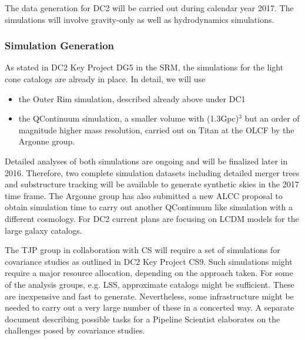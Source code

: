 The data generation for DC2 will be carried out during calendar year 2017. The simulations will involve gravity-only as well as hydrodynamics simulations.


\subsubsection{Simulation Generation}
\label{sec:keysims:dc2:simgen}




As stated in DC2 Key Project DG5 in the SRM, the simulations for the light cone catalogs are already in place. In detail, we will use
\begin{itemize}
\item the Outer Rim simulation, described already above under DC1
\item the QContinuum simulation, a smaller volume with (1.3Gpc)$^3$ but an order of magnitude higher mass resolution, carried out on Titan at the OLCF by the Argonne group. 
\end{itemize}
Detailed analyses of both simulations are ongoing and will be finalized later in 2016. Therefore, two complete simulation datasets including detailed merger trees and substructure tracking will be available to generate synthetic skies in the 2017 time frame. The Argonne group has also submitted a new ALCC proposal to obtain simulation time to carry out another QContinuum like simulation with a different cosmology. For DC2 current plans are focusing on LCDM models for the large galaxy catalogs.

The TJP group in collaboration with CS will require a set of simulations for covariance studies as outlined in DC2 Key Project CS9. Such simulations might require a major resource allocation, depending on the approach taken. For some of the analysis groups, e.g. LSS, approximate catalogs might be sufficient. These are inexpensive and fast to generate. Nevertheless, some infrastructure might be needed to carry out a very large number of these in a concerted way. A separate document describing possible tasks for a Pipeline Scientist elaborates on the challenges posed by covariance studies. 

